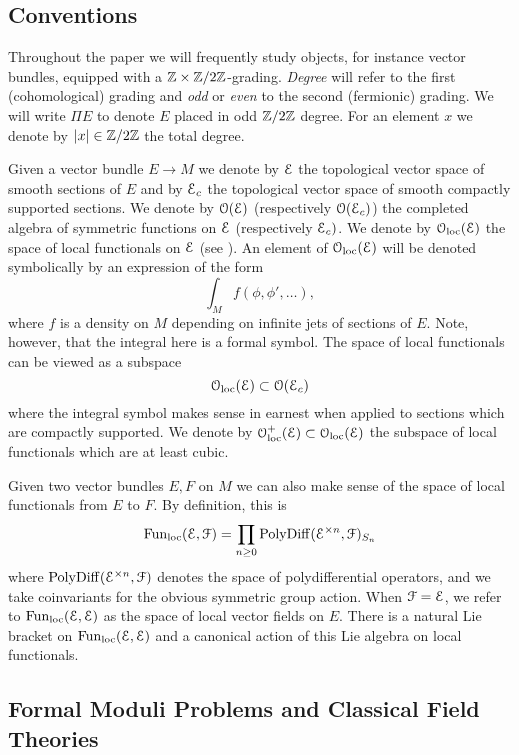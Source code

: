 \documentclass[10pt, oneside]{article}
\begin{document}
\subsection{Conventions}
Throughout the paper we will frequently study objects, for instance vector bundles, equipped with a $\mathbb Z\times\mathbb Z/2\mathbb Z$-grading. \emph{Degree} will refer to the first (cohomological) grading and \emph{odd} or \emph{even} to the second (fermionic) grading.  We will write $\Pi E$ to denote $E$ placed in odd $\mathbb Z/2\mathbb Z$ degree.  For an element $x$ we denote by $|x|\in\mathbb Z/2\mathbb Z$ the total degree.

Given a vector bundle $E\rightarrow M$ we denote by $\mathcal E$ the topological vector space of smooth sections of $E$ and by $\mathcal E_c$ the topological vector space of smooth compactly supported sections.
We denote by $\mathcal O(\mathcal E)$ (respectively $\mathcal O(\mathcal E_c)$) the completed algebra of symmetric functions on $\mathcal E$ (respectively $\mathcal E_c)$. 
We denote by $\mathcal{O}_{\rm loc}(\mathcal E)$ the space of local functionals on $\mathcal E$ (see \cite[Definition 4.5.1.1]{Book2}). An element of $\mathcal{O}_{\rm loc}(\mathcal E)$ will be denoted symbolically by an expression of the form
\[\int_M f (\phi, \phi', \dots),\]
where $f$ is a density on $M$ depending on infinite jets of sections of $E$. Note, however, that the integral here is a formal symbol. 
The space of local functionals can be viewed as a subspace
\[
\mathcal{O}_{\rm loc}(\mathcal E) \subset \mathcal O(\mathcal E_c)
\]
where the integral symbol makes sense in earnest when applied to sections which are compactly supported.
We denote by $\mathcal{O}_{\rm loc}^+(\mathcal E)\subset \mathcal{O}_{\rm loc}(\mathcal E)$ the subspace of local functionals which are at least cubic.

Given two vector bundles $E, F$ on $M$ we can also make sense of the space of local functionals from $E$ to $F$.
By definition, this is 
\[
{\rm Fun}_{\rm loc}(\mathcal E, \mathcal F) = \prod_{n \geq 0} {\rm PolyDiff}(\mathcal E^{\times n}, \mathcal F)_{S_n}
\]
where ${\rm PolyDiff}(\mathcal E^{\times n}, \mathcal F)$ denotes the space of polydifferential operators, and we take coinvariants for the obvious symmetric group action.
When $\mathcal F = \mathcal E$, we refer to ${\rm Fun}_{\rm loc}(\mathcal E, \mathcal E)$ as the space of local vector fields on $E$. 
There is a natural Lie bracket on ${\rm Fun}_{\rm loc}(\mathcal E, \mathcal E)$ and a canonical action of this Lie algebra on local functionals. 

\subsection{Formal Moduli Problems and Classical Field Theories}
\label{sect:FMPs}
\end{document}
